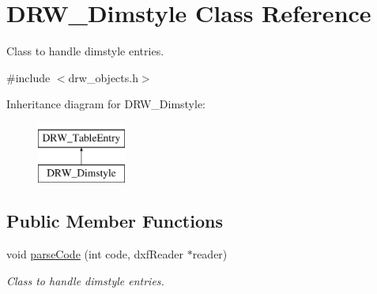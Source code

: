 \hypertarget{class_d_r_w___dimstyle}{}\section{D\+R\+W\+\_\+\+Dimstyle Class Reference}
\label{class_d_r_w___dimstyle}


Class to handle dimstyle entries.  




{\ttfamily \#include $<$drw\+\_\+objects.\+h$>$}

Inheritance diagram for D\+R\+W\+\_\+\+Dimstyle\+:\begin{figure}[H]
\begin{center}
\leavevmode
\includegraphics[height=2.000000cm]{dc/dad/class_d_r_w___dimstyle}
\end{center}
\end{figure}
\subsection*{Public Member Functions}
\begin{DoxyCompactItemize}
\item 
void \hyperlink{class_d_r_w___dimstyle_a31a3e3bf8780ee8b7b08efc145125e96}{parse\+Code} (int code, dxf\+Reader $\ast$reader)
\begin{DoxyCompactList}\small\item\em Class to handle dimstyle entries. \end{DoxyCompactList}\end{DoxyCompactItemize}
